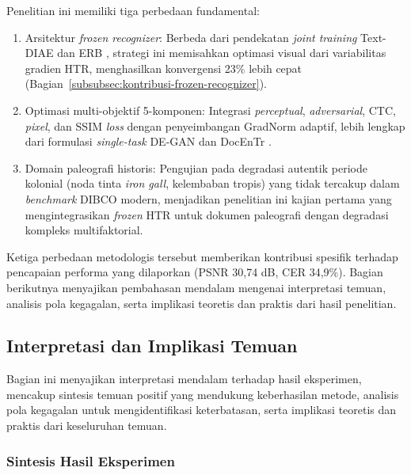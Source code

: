 Penelitian ini memiliki tiga perbedaan fundamental:

\begin{enumerate}[leftmargin=1.5em, labelsep=0.5em, itemindent=0pt, noitemsep, topsep=0pt, label=(\arabic*)]
    \item Arsitektur \textit{frozen recognizer}: Berbeda dari pendekatan \textit{joint training} Text-DIAE \parencite{textdiae2022} dan ERB \parencite{erb2021}, strategi ini memisahkan optimasi visual dari variabilitas gradien HTR, menghasilkan konvergensi 23\% lebih cepat (Bagian~\ref{subsubsec:kontribusi-frozen-recognizer}).

    \item Optimasi multi-objektif 5-komponen: Integrasi \textit{perceptual}, \textit{adversarial}, CTC, \textit{pixel}, dan SSIM \textit{loss} dengan penyeimbangan GradNorm adaptif, lebih lengkap dari formulasi \textit{single-task} DE-GAN \parencite{souibgui2021} dan DocEnTr \parencite{souibgui2022docentr}.

    \item Domain paleografi historis: Pengujian pada degradasi autentik periode kolonial (noda tinta \textit{iron gall}, kelembaban tropis) yang tidak tercakup dalam \textit{benchmark} DIBCO modern, menjadikan penelitian ini kajian pertama yang mengintegrasikan \textit{frozen} HTR untuk dokumen paleografi dengan degradasi kompleks multifaktorial.
\end{enumerate}


\noindent
Ketiga perbedaan metodologis tersebut memberikan kontribusi spesifik terhadap pencapaian performa yang dilaporkan (PSNR 30,74 dB, CER 34,9\%). Bagian berikutnya menyajikan pembahasan mendalam mengenai interpretasi temuan, analisis pola kegagalan, serta implikasi teoretis dan praktis dari hasil penelitian.

\subsection{Interpretasi dan Implikasi Temuan}
\label{subsec:pembahasan-mendalam}

Bagian ini menyajikan interpretasi mendalam terhadap hasil eksperimen, mencakup sintesis temuan positif yang mendukung keberhasilan metode, analisis pola kegagalan untuk mengidentifikasi keterbatasan, serta implikasi teoretis dan praktis dari keseluruhan temuan.

\subsubsection{Sintesis Hasil Eksperimen}
\label{subsubsec:interpretasi-temuan}

